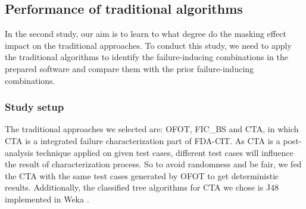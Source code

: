 \documentclass{sig-alternate}
\begin{document}
\subsection{Performance of traditional algorithms}
In the second study, our aim is to learn to what degree do the masking effect impact on the traditional approaches. To conduct this study, we need to apply the traditional algorithms to identify the failure-inducing combinations in the prepared software and compare them with the prior failure-inducing combinations.

%


\subsubsection{Study setup}
The traditional approaches we selected are: OFOT\cite{nie2011minimal}, FIC\_BS \cite{zhang2011characterizing} and CTA\cite{yilmaz2006covering}, in which CTA is a integrated failure characterization part of FDA-CIT\cite{yilmaz2013reducing}. As CTA is a post-analysis technique applied on given test cases, different test cases will influence the result of characterization process. So to avoid randomness and be fair, we fed the CTA with the same test cases generated by OFOT to get deterministic results. Additionally, the classified tree algorithms for CTA we chose is J48 implemented in Weka \cite{hall2009weka}. %
\end{document}
